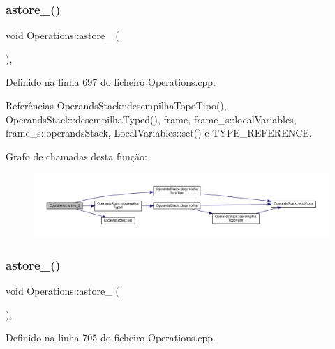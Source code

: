 \subsubsection{\texorpdfstring{astore\+\_()}{astore\_2()}}
{\footnotesize\ttfamily void Operations\+::astore\+\_ (\begin{DoxyParamCaption}{ }\end{DoxyParamCaption})\hspace{0.3cm}{\ttfamily [static]}, {\ttfamily [private]}}



Definido na linha 697 do ficheiro Operations.\+cpp.



Referências Operands\+Stack\+::desempilha\+Topo\+Tipo(), Operands\+Stack\+::desempilha\+Typed(), frame, frame\+\_\+s\+::local\+Variables, frame\+\_\+s\+::operands\+Stack, Local\+Variables\+::set() e T\+Y\+P\+E\+\_\+\+R\+E\+F\+E\+R\+E\+N\+CE.

Grafo de chamadas desta função\+:\nopagebreak
\begin{figure}[H]
\begin{center}
\leavevmode
\includegraphics[width=350pt]{classOperations_a01e238bbea0f9d61d80a8fcd3ed2f660_cgraph}
\end{center}
\end{figure}
\mbox{\label{classOperations_ac3c02b3ff78b6222bd58bebb4f01c083}} 
\subsubsection{\texorpdfstring{astore\+\_()}{astore\_3()}}
{\footnotesize\ttfamily void Operations\+::astore\+\_ (\begin{DoxyParamCaption}{ }\end{DoxyParamCaption})\hspace{0.3cm}{\ttfamily [static]}, {\ttfamily [private]}}



Definido na linha 705 do ficheiro Operations.\+cpp.



